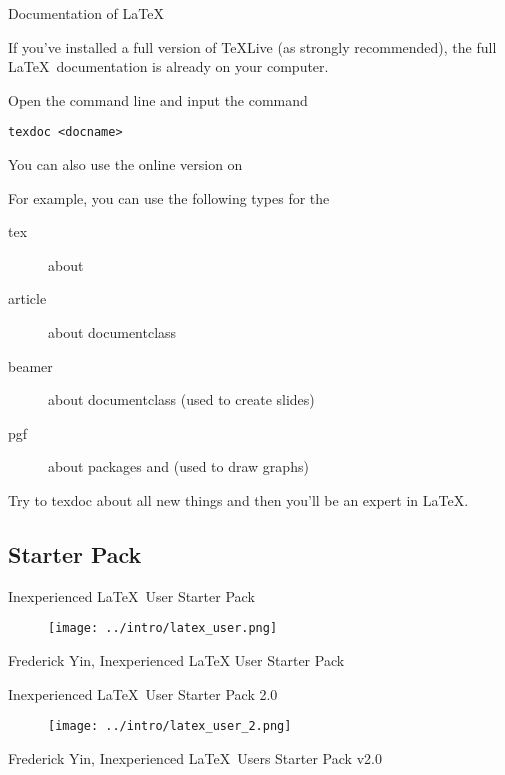 \begin{frame}[fragile]{Documentation of \LaTeX}

    If you've installed a full version of \TeX Live (as strongly recommended), the full \LaTeX\ documentation is already on your computer. \medskip

    \pause

    Open the command line and input the command

    \begin{verbatim}
texdoc <docname>
    \end{verbatim}

    \pause

    You can also use the online version on  \medskip

    \pause

    For example, you can use the following types for the 
    \begin{description}
        \item[tex] 		about \structure{\TeX}
        \item[article] 	about documentclass 
        \item[beamer] 	about documentclass  (used to create slides)
        \item[pgf]		about packages  and  (used to draw graphs)
    \end{description}

    \pause

    \smallskip
    Try to \alert{texdoc} about all new things and then you'll be an expert in \LaTeX.
\end{frame}

\subsection*{Starter Pack}

\begin{frame}{Inexperienced \LaTeX\  User Starter Pack}
    \begin{figure}[h]
        \centering
        \texttt{[image: ../intro/latex\_user.png]}
    \end{figure}
    \tiny{Frederick Yin, Inexperienced LaTeX User Starter Pack}
\end{frame}

\begin{frame}{Inexperienced \LaTeX\  User Starter Pack 2.0}
    \begin{figure}[h]
        \centering
        \texttt{[image: ../intro/latex\_user\_2.png]}
    \end{figure}
    \tiny{Frederick Yin, Inexperienced \LaTeX\  Users Starter Pack v2.0}
\end{frame}
